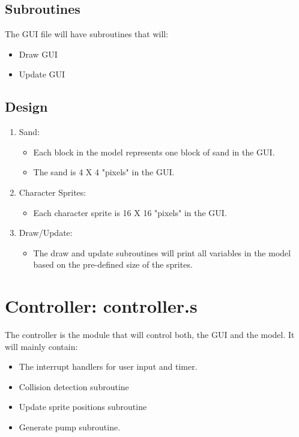 \subsection{Subroutines}

The GUI file will have subroutines that will:

\begin{itemize}
  \item Draw GUI
  \item Update GUI
\end{itemize}

\subsection{Design}

\begin{enumerate}

  \item Sand:
  \begin{itemize}
    \item Each block in the model represents one block of sand in the GUI.
    \item The sand is 4 X 4 "pixels" in the GUI.
  \end{itemize}
  
  \item Character Sprites:
  \begin{itemize}
    \item Each character sprite is 16 X 16 "pixels" in the GUI.
  \end{itemize}
  
  \item Draw/Update:
  \begin{itemize}
    \item The draw and update subroutines will print all variables in the model based on the pre-defined size of the sprites.
  \end{itemize}

\end{enumerate}

\section{Controller: controller.s}

The controller is the module that will control both, the GUI and the model.
It will mainly contain:

\begin{itemize}
  \item The interrupt handlers for user input and timer.
  \item Collision detection subroutine
  \item Update sprite positions subroutine
  \item Generate pump subroutine.
\end{itemize}

